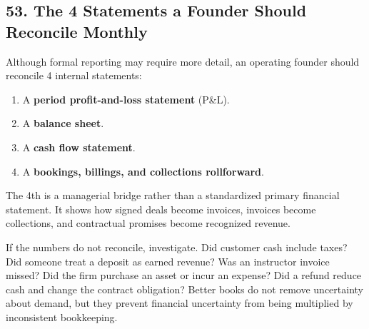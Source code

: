 \subsection*{53. The 4 Statements a Founder Should Reconcile Monthly}

Although formal reporting may require more detail, an operating founder should reconcile 4 internal statements:
\begin{enumerate}
  \item A \textbf{period profit-and-loss statement} (P\&L).
  \item A \textbf{balance sheet}.
  \item A \textbf{cash flow statement}.
  \item A \textbf{bookings, billings, and collections rollforward}.
\end{enumerate}
The 4th is a managerial bridge rather than a standardized primary financial statement. It shows how signed deals become invoices, invoices become collections, and contractual promises become recognized revenue.

If the numbers do not reconcile, investigate. Did customer cash include taxes? Did someone treat a deposit as earned revenue? Was an instructor invoice missed? Did the firm purchase an asset or incur an expense? Did a refund reduce cash and change the contract obligation? Better books do not remove uncertainty about demand, but they prevent financial uncertainty from being multiplied by inconsistent bookkeeping.
